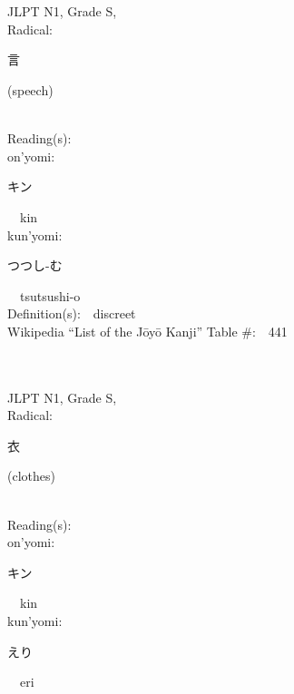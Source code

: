 \begin{multicols}{2}
\ \ \\
{\fontsize{34pt}{40pt}  }\ \ \\
{JLPT N1, Grade S, \\Radical:\ \ {\begin{CJK}{UTF8}{min} 言 \end{CJK}} (speech) } \\
Reading(s):\ \ \\
{\hspace*{1em}}on'yomi:\ \ \\
{\hspace*{2em}}{\begin{CJK}{UTF8}{min} キン \end{CJK}}\ \ kin\ \ \\
{\hspace*{1em}}kun'yomi:\ \ \\
{\hspace*{2em}}{\begin{CJK}{UTF8}{min} つつし-む \end{CJK}}\ \ tsutsushi-o\ \ \\
Definition(s):\ \ discreet \\
Wikipedia ``List of the J\=oy\=o Kanji'' Table \#:\ \ 441 \\
\ \ \\
{\fontsize{34pt}{40pt}  }\ \ \\
{JLPT N1, Grade S, \\Radical:\ \ {\begin{CJK}{UTF8}{min} 衣 \end{CJK}} (clothes) } \\
Reading(s):\ \ \\
{\hspace*{1em}}on'yomi:\ \ \\
{\hspace*{2em}}{\begin{CJK}{UTF8}{min} キン \end{CJK}}\ \ kin\ \ \\
{\hspace*{1em}}kun'yomi:\ \ \\
{\hspace*{2em}}{\begin{CJK}{UTF8}{min} えり \end{CJK}}\ \ eri\ \ \\

\end{multicols}
